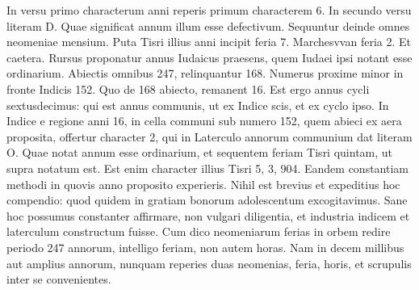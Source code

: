 In versu primo characterum anni reperis primum characterem
6.
In secundo versu literam \textsc{D}.
Quae significat annum illum esse
defectivum.
Sequuntur deinde omnes neomeniae mensium.
Puta Tisri
illius anni incipit feria 7.
Marchesvvan feria 2.
Et caetera.
Rursus
proponatur annus Iudaicus praesens, quem Iudaei ipsi notant esse ordinarium.
%
Abiectis omnibus 247, relinquantur 168.
Numerus proxime
minor in fronte Indicis 152.
Quo de 168 abiecto, remanent 16.
Est ergo annus cycli sextusdecimus: qui est annus communis, ut
ex Indice scis, et ex cyclo ipso.
In Indice e regione anni 16, in cella
communi sub numero 152, quem abieci ex aera proposita, offertur
character 2, qui in Laterculo annorum communium dat literam \textsc{O}.
Quae notat annum esse ordinarium, et sequentem feriam Tisri quintam,
ut supra notatum est.
Est enim character illius Tisri 5, 3, 904.
Eandem constantiam methodi in quovis anno proposito experieris.
Nihil est brevius et expeditius hoc compendio: quod quidem in gratiam
bonorum adolescentum excogitavimus.
Sane hoc possumus
constanter affirmare, non vulgari diligentia, et industria indicem et
laterculum constructum fuisse.
Cum dico neomeniarum ferias in
orbem redire periodo 247 annorum, intelligo feriam, non autem
horas.
Nam in decem millibus aut amplius annorum, nunquam reperies
duas neomenias, feria, horis, et scrupulis inter se convenientes.
%
